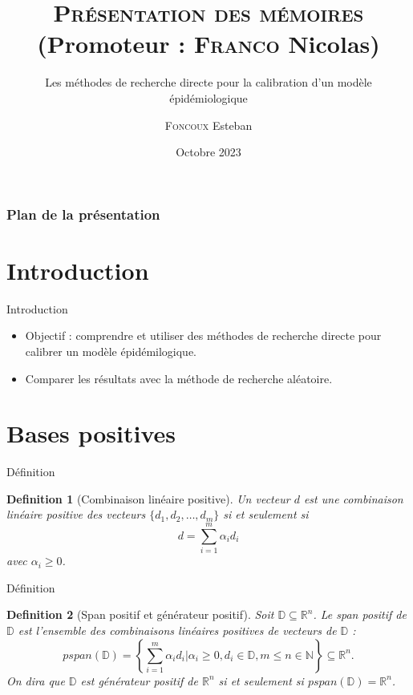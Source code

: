 \documentclass{beamer}
\title[Recherche directe et calibration]{{\small \textsc{Présentation des mémoires}} \\ {\scriptsize(Promoteur : \textsc{Franco} Nicolas)}}
\subtitle{\Large Les méthodes de recherche directe pour la calibration d’un modèle épidémiologique}
\author[\textsc{Foncoux} E.]{\textsc{Foncoux} Esteban}
\institute[UNamur]{}
\date{Octobre 2023}
\newtheorem{defn}{Definition}
\begin{document}
\begin{frame}
  \titlepage
\end{frame}

\logo{}

\begin{frame}
    \frametitle{Plan de la présentation}
    \tableofcontents
\end{frame}



\section{Introduction}

\begin{frame}{Introduction}
    \begin{itemize}
        \item Objectif : comprendre et utiliser des méthodes de recherche directe pour calibrer un modèle épidémilogique.
        \item Comparer les résultats avec la méthode de recherche aléatoire.
    \end{itemize}
\end{frame}

\section{Bases positives}

\begin{frame}{Définition}
    \begin{defn}[Combinaison linéaire positive]
        Un vecteur $d$ est une combinaison linéaire positive des vecteurs $\{d_1,d_2,\dots,d_m\}$ si et seulement si 
    $$
        d=\sum_{i=1}^m \alpha_i d_i
    $$
    avec $\alpha_i \geq 0$.
    \end{defn}
    
\end{frame}

\begin{frame}{Définition}
    \begin{defn}[Span positif et générateur positif]
        Soit $\mathbb{D} \subseteq \mathbb{R}^n$. Le span positif de $\mathbb{D}$ est l'ensemble des combinaisons linéaires positives de vecteurs de $\mathbb{D}$ : 
        $$
            pspan(\mathbb{D}) = \left\{ \sum_{i=1}^m \alpha_i d_i | \alpha_i \geq 0, d_i\in\mathbb{D},m\leq n \in \mathbb{N}  \right\} \subseteq \mathbb{R}^n.
        $$
    On dira que $\mathbb{D}$ est générateur positif de $\mathbb{R}^n$ si et seulement si $pspan(\mathbb{D}) = \mathbb{R}^n$.
    \end{defn}
    
\end{frame}
\end{document}
